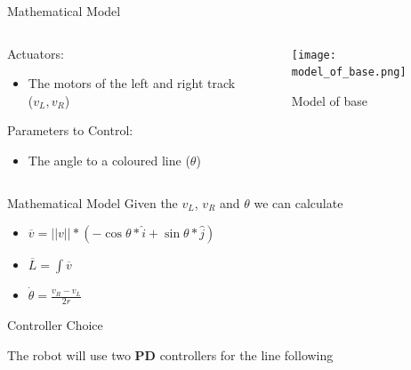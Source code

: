 \documentclass{beamer}
\begin{document}


\begin{frame}{Mathematical Model}
    \begin{columns}
    \begin{column}[]{0.5\textwidth}
    Actuators:
        \begin{itemize}
            \item The motors of the left and right track ($v_L,v_R$)
        \end{itemize}
    Parameters to Control:
    \begin{itemize}
        \item The angle to a coloured line ($\theta$)
    \end{itemize}
    \end{column}
    \begin{column}[]{0.5\textwidth}
    \begin{figure}
        \centering
        \texttt{[image: model\_of\_base.png]}
        \caption{Model of base}
        \label{fig:my_label}
    \end{figure}
    \end{column}
    \end{columns}
    \end{frame}
    
    
    
    
    \begin{frame}{Mathematical Model}
    Given the $v_L$, $v_R$ and $\theta$ we can calculate
        \begin{itemize}
            \item $\overline{v}=||v||*(-\cos{\theta}*\hat{i}+\sin{\theta}*\hat{j})$
            \item $\overline{L}=\int \overline{v}$
            \item $\dot{\theta}=\frac{v_R-v_L}{2 r}$
        \end{itemize}
    \end{frame}
    
    
    
    
    \begin{frame}{Controller Choice}
    
        The robot will use two \textbf{PD} controllers for the line following
        
    \end{frame}
    
\end{document}
